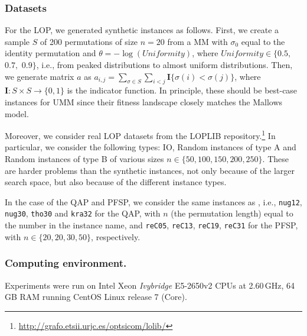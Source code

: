 \documentclass[runningheads]{llncs}
\begin{document}
\subsubsection{Datasets}
%
For the LOP, we generated synthetic instances as follows. First, we create a sample $S$ of 200 permutations of size $n=20$ from a MM with $\sigma_0$ equal to the identity permutation and $\theta=-\log(\textit{Uniformity})$, where  $\textit{Uniformity}\in\{0.5,$ $0.7,$ $0.9\}$, i.e., from peaked distributions to almost uniform distributions. Then, we generate matrix $a$ as $a_{i,j} = \sum_{\sigma\in S}\sum_{i<j}\mathbf{I}\{\sigma(i)<\sigma(j)\}$, where $\mathbf{I}\colon S \times S \to \{0,1\}$ is the indicator function. In principle, these should be best-case instances for UMM since their fitness landscape closely matches the Mallows model.%

Moreover, we consider real LOP datasets from the LOPLIB
repository.\footnote{\url{http://grafo.etsii.urjc.es/optsicom/lolib/}} In
particular, we consider the following types: IO, Random instances of type A and
Random instances of type B of various sizes $n \in \{50, 100, 150, 200,
250\}$. These are harder problems than the synthetic instances, not only
because of the larger search space, but also because of the different instance
types.

In the case of the QAP and PFSP, we consider the same instances as
\citet{ZaeStoFriFisNauBar2014,ZaeStoBar2014:ppsn}, i.e.,
\texttt{nug12}, \texttt{nug30}, \texttt{tho30} and \texttt{kra32} for the QAP,
with $n$ (the permutation length) equal to the number in the instance name, and \texttt{reC05},
\texttt{reC13}, \texttt{reC19}, \texttt{reC31} for the PFSP, with
$n \in \{20, 20, 30, 50\}$, respectively.

\subsubsection{Computing environment.}
Experiments were run on Intel Xeon \emph{Ivybridge} E5-2650v2 CPUs at
2.60\,GHz, 64\,GB RAM running CentOS Linux release 7 (Core).
\end{document}
